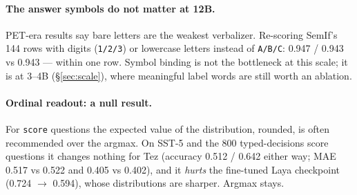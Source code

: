 \documentclass[11pt,a4paper]{article}
\newcommand{\code}[1]{\texttt{#1}}
\begin{document}
\paragraph{The answer symbols do not matter at 12B.} PET-era results say bare letters are the weakest verbalizer. Re-scoring SemIf's 144 rows with digits (\code{1/2/3}) or lowercase letters instead of \code{A/B/C}: 0.947 / 0.943 vs 0.943 --- within one row. Symbol binding is not the bottleneck at this scale; it is at 3--4B (\S\ref{sec:scale}), where meaningful label words are still worth an ablation.

\paragraph{Ordinal readout: a null result.} For \code{score} questions the expected value of the distribution, rounded, is often recommended over the argmax. On SST-5 and the 800 typed-decisions score questions it changes nothing for Tez (accuracy 0.512 / 0.642 either way; MAE 0.517 vs 0.522 and 0.405 vs 0.402), and it \emph{hurts} the fine-tuned Laya checkpoint (0.724 $\to$ 0.594), whose distributions are sharper. Argmax stays.
\end{document}
